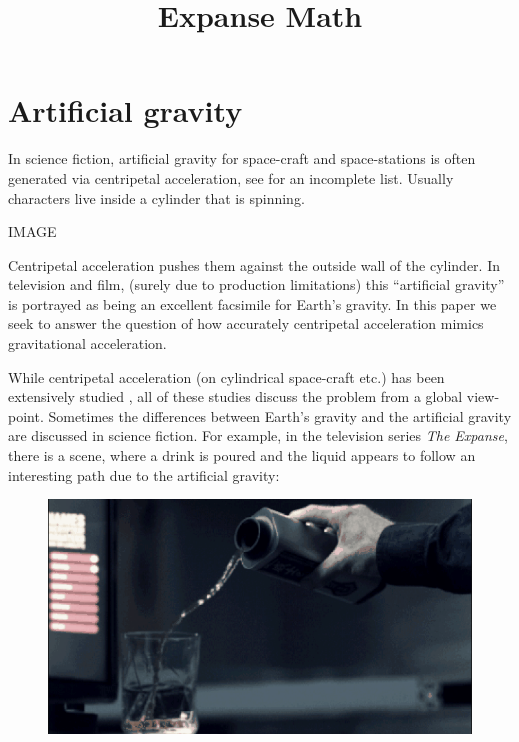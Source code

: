 \documentclass{amsart}
\title{Expanse Math}
\theoremstyle{definition}
\begin{document}
\maketitle

\section{Artificial gravity}

In science fiction, artificial gravity for space-craft and
space-stations is often generated via centripetal acceleration, see
\cite{2001,2010,missiontomars,themartian,expanse,babylon5,europareport,ringworld?,rama,intersetller,etc}
for an incomplete list. Usually characters live inside a cylinder that
is spinning.

IMAGE

Centripetal acceleration pushes them against the outside wall of the
cylinder.  In television and film, (surely due to production
limitations) this ``artificial gravity'' is portrayed as being an
excellent facsimile for Earth's gravity. In this paper we seek to
answer the question of how accurately centripetal acceleration mimics
gravitational acceleration.


While centripetal acceleration (on cylindrical space-craft etc.) has
been extensively studied \cite{papers,anotherpaper}, all of these
studies discuss the problem from a global view-point. Sometimes the
differences between Earth's gravity and the artificial gravity are
discussed in science fiction. For example, in the television series
\textit{The Expanse}, there is a scene, where a drink is poured and
the liquid appears to follow an interesting path due to the artificial
gravity:

\begin{figure}
	\centering
	\includegraphics[width=0.7\linewidth]{pour.png}
	\caption{}
	\label{fig:pour}
\end{figure}
\end{document}
